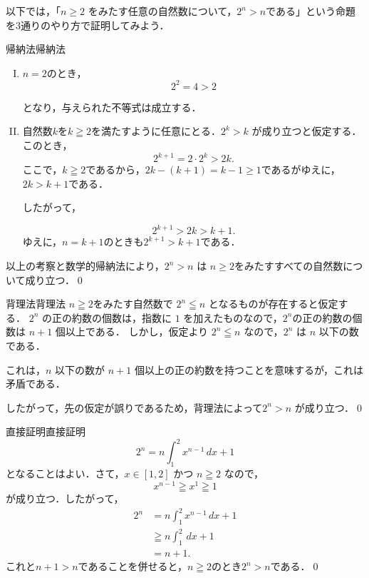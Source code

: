以下では，「$n \geq 2$ をみたす任意の自然数について，$2^n > n$である」という命題を3通りのやり方で証明してみよう．

\begin{example}{帰納法}{帰納法}
  \begin{enumerate}[(I)]
    \item $n=2$のとき，
          \[
            2^2 = 4 > 2
          \]

          となり，与えられた不等式は成立する．
    \item 自然数$k$を$k \geqq 2$を満たすように任意にとる．$2^k > k$ が成り立つと仮定する．このとき，
          \[
            2^{k+1} = 2 \cdot 2^k > 2k.
          \]
          ここで，$k \geqq 2$であるから，$2k - (k + 1) = k - 1 \geq 1$であるがゆえに，$2k > k + 1$である．

          したがって，

          \[
            2^{k+1} > 2k > k + 1.
          \]
          ゆえに，$n=k+1$のときも$2^{k+1} > k + 1$である．
  \end{enumerate}

  以上の考察と数学的帰納法により，$2^n > n$ は $n \geq 2$をみたすすべての自然数について成り立つ．\qed
\end{example}

\begin{example}{背理法}{背理法}
  $n \geqq 2$をみたす自然数で $2^n \leqq n$ となるものが存在すると仮定する．
  $2^n$ の正の約数の個数は，指数に $1$ を加えたものなので，$2^n$の正の約数の個数は $n + 1$ 個以上である．
  しかし，仮定より $2^n \leqq n$ なので，$2^n$ は $n$ 以下の数である．

  これは，$n$ 以下の数が $n + 1$ 個以上の正の約数を持つことを意味するが，これは矛盾である．

  したがって，先の仮定が誤りであるため，背理法によって$2^n > n$ が成り立つ．\qed
\end{example}

\begin{example}{直接証明}{直接証明}
  \[
    2^n = n \int_{1}^{2} x^{n-1} \, dx + 1
  \]
  となることはよい．さて，$x \in [1, 2]$ かつ $n \geqq 2$ なので，
  \[
    x^{n-1} \geqq x^{1} \geqq 1
  \]
  が成り立つ．したがって，
  \begin{align*}
    2^n & = n \int_{1}^{2} x^{n-1} \, dx + 1 \\
        & \geqq  n \int_{1}^{2} \, dx +1     \\
        & = n+1.
  \end{align*}
  これと$n+1 >n$であることを併せると，$n \geqq 2$のとき$2^n > n$である．\qed
\end{example}